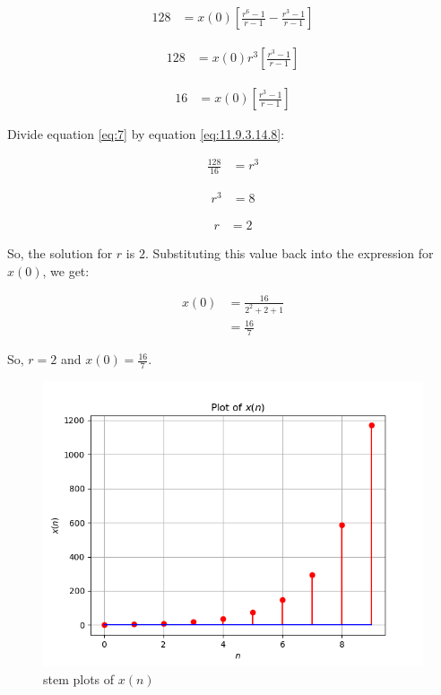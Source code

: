 \documentclass[journal,12pt,onecolumn]{IEEEtran}
\theoremstyle{remark}
\begin{document}
\begin{align}
128 &= x(0)\left[\frac{r^6 - 1}{r - 1} - \frac{r^3 - 1}{r - 1}\right] \label{eq:11.9.3.14.8}
\end{align}

\begin{align}
128 &= x(0)r^3\left[\frac{r^3 - 1}{r - 1}\right] \label{eq:11.9.3.14.9}
\end{align}

\begin{align}
16 &= x(0)\left[\frac{r^3 - 1}{r - 1}\right] \label{eq:11.9.3.14.10}
\end{align}

Divide equation \eqref{eq:7} by equation \eqref{eq:11.9.3.14.8}:

\begin{align}
\frac{128}{16} &= r^3 \label{eq:11.9.3.14.11}
\end{align}

\begin{align}
r^3 &= 8 \label{eq:11.9.3.14.12}
\end{align}

\begin{align}
r &= 2 \label{eq:11.9.3.14.13}
\end{align}

So, the solution for $r$ is $2$. Substituting this value back into the expression for $x(0)$, we get:

\begin{align}
x(0) &= \frac{16}{2^2 + 2 + 1} \label{eq:11.9.3.14.14} \\
&= \frac{16}{7} \label{eq:11.9.3.14.16}
\end{align}

So, $r = 2$ and $x(0) = \frac{16}{7}$.
\begin{figure}[h!]
    \centering
    \includegraphics[width=\columnwidth]{ncert-maths/11/9/3/14/figs/plotx.png}
    \caption{stem plots of $x(n)$}
    \label{fig:11.9.3.14.1}
\end{figure}
\end{document}

